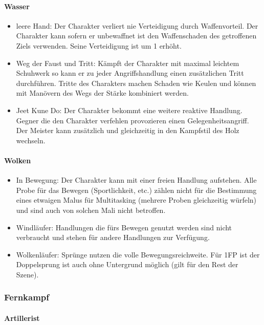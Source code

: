 \documentclass{article}
\begin{document}
\paragraph{Wasser}

\begin{itemize}
\item leere Hand: Der Charakter verliert nie Verteidigung durch Waffenvorteil. Der Charakter kann sofern er unbewaffnet ist den Waffenschaden des getroffenen Ziels verwenden. Seine Verteidigung ist um 1 erhöht.
\item Weg der Faust und Tritt: Kämpft der Charakter mit maximal leichtem Schuhwerk so kann er zu jeder Angriffshandlung einen zusätzlichen Tritt durchführen. Tritte des Charakters machen Schaden wie Keulen und können mit Manövern des Wegs der Stärke kombiniert werden.
\item Jeet Kune Do: Der Charakter bekommt eine weitere reaktive Handlung. Gegner die den Charakter verfehlen provozieren einen Gelegenheitsangriff. Der Meister kann zusätzlich und gleichzeitig in den Kampfstil des Holz wechseln.
\end{itemize}

\paragraph{Wolken}

\begin{itemize}
\item In Bewegung: Der Charakter kann mit einer freien Handlung aufstehen. Alle Probe für das Bewegen (Sportlichkeit, etc.) zählen nicht für die Bestimmung eines etwaigen Malus für Multitasking (mehrere Proben gleichzeitig würfeln) und sind auch von solchen Mali nicht betroffen.
\item Windläufer: Handlungen die fürs Bewegen genutzt werden sind nicht verbraucht und stehen für andere Handlungen zur Verfügung.
\item Wolkenläufer: Sprünge nutzen die volle Bewegungsreichweite. Für 1FP ist der Doppelsprung ist auch ohne Untergrund möglich (gilt für den Rest der Szene). 
\end{itemize}

\subsubsection{Fernkampf}

\paragraph{Artillerist}
\end{document}
